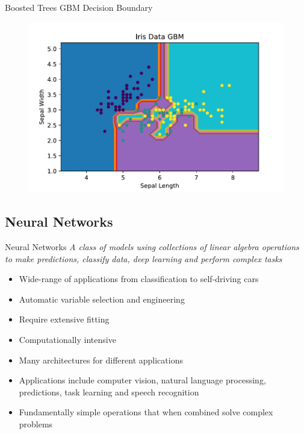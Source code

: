 \documentclass[10pt]{beamer}
\begin{document}
\begin{frame}{Boosted Trees}
GBM Decision Boundary
		\begin{figure}	
			\includegraphics[width=1.0\textwidth, center, trim=0cm 0cm 0 0cm]{images/Iris_Data_GBM.pdf}
	\end{figure}
\end{frame}

\subsection{Neural Networks}
\begin{frame}{Neural Networks}
\emph{A class of models using collections of linear algebra operations to make predictions, classify data, deep learning and perform complex tasks}
	\begin{itemize}
		\item Wide-range of applications from classification to self-driving cars
		\item Automatic variable selection and engineering
		\item Require extensive fitting 
		\item Computationally intensive
		\item \alert{Many} architectures for different applications
		\item Applications include computer vision, natural language processing, predictions, task learning and speech recognition
		\item Fundamentally simple operations that when combined solve complex problems
	\end{itemize}
\end{frame}
\end{document}
